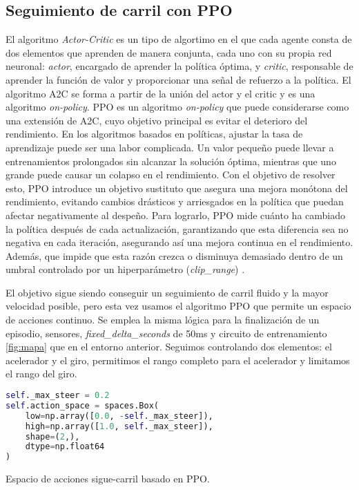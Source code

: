 \subsection{Seguimiento de carril con \ac{PPO}}

El algoritmo \textit{Actor-Critic} es un tipo de algortimo en el que cada agente consta de dos elementos que aprenden de manera conjunta, cada uno con su propia red neuronal: \textit{actor}, encargado de aprender la política óptima, y \textit{critic}, responsable de aprender la función de valor y proporcionar una señal de refuerzo a la política. El algoritmo \ac{A2C} se forma a partir de la unión del actor y el critic y es una algoritmo \textit{on-policy}. \ac{PPO} es un algoritmo \textit{on-policy} que puede considerarse como una extensión de \ac{A2C}, cuyo objetivo principal es evitar el deterioro del rendimiento. En los algoritmos basados en políticas, ajustar la tasa de aprendizaje puede ser una labor complicada. Un valor pequeño puede llevar a entrenamientos prolongados sin alcanzar la solución óptima, mientras que uno grande puede causar un colapso en el rendimiento. Con el objetivo de resolver esto, \ac{PPO} introduce un objetivo sustituto que asegura una mejora monótona del rendimiento, evitando cambios drásticos y arriesgados en la política que puedan afectar negativamente al despeño. Para lograrlo, \ac{PPO} mide cuánto ha cambiado la política después de cada actualización, garantizando que esta diferencia sea no negativa en cada iteración, asegurando así una mejora continua en el rendimiento. Además, que impide que esta razón crezca o disminuya demasiado dentro de un umbral controlado por un hiperparámetro (\textit{clip\_range}) \cite{drl}. 

El objetivo sigue siendo conseguir un seguimiento de carril fluido y la mayor velocidad posible, pero esta vez usamos el algoritmo \ac{PPO} que permite un espacio de acciones continuo. Se emplea la misma lógica para la finalización de un episodio, sensores, \textit{fixed\_delta\_seconds} de 50ms y circuito de entrenamiento \ref{fig:mapa} que en el entorno anterior. Seguimos controlando dos elementos: el acelerador y el giro, permitimos el rango completo para el acelerador y limitamos el rango del giro.

\begin{code}[h]
\begin{lstlisting}[language=Python]
self._max_steer = 0.2
self.action_space = spaces.Box(
    low=np.array([0.0, -self._max_steer]),
    high=np.array([1.0, self._max_steer]),
    shape=(2,),
    dtype=np.float64
)
\end{lstlisting}
\caption[Espacio de acciones sigue-carril basado en \ac{PPO}]{Espacio de acciones sigue-carril basado en \ac{PPO}.}
\label{cod:acc_ppo}
\end{code}


